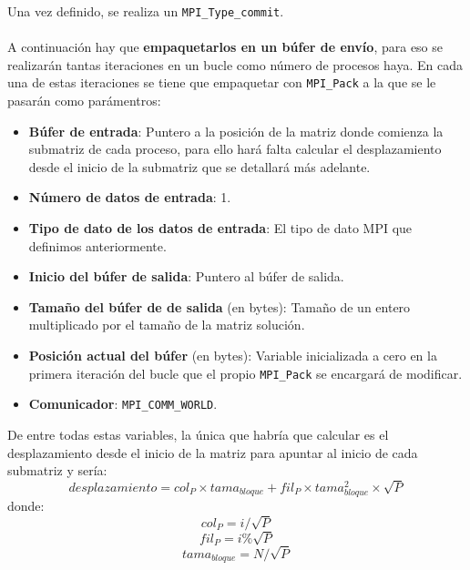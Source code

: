Una vez definido, se realiza un \texttt{MPI\_Type\_commit}.
\\ \\
A continuación hay que \textbf{empaquetarlos en un búfer de envío}, para eso se realizarán tantas iteraciones en un bucle como número de procesos haya. En cada una de estas iteraciones se tiene que empaquetar con \texttt{MPI\_Pack} a la que se le pasarán como parámentros:
\begin{itemize}
	\item \textbf{Búfer de entrada}: Puntero a la posición de la matriz donde comienza la submatriz de cada proceso, para ello hará falta calcular el desplazamiento desde el inicio de la submatriz que se detallará más adelante.
	\item \textbf{Número de datos de entrada}: 1.
	\item \textbf{Tipo de dato de los datos de entrada}: El tipo de dato MPI que definimos anteriormente.
	\item \textbf{Inicio del búfer de salida}: Puntero al búfer de salida.
	\item \textbf{Tamaño del búfer de de salida} (en bytes): Tamaño de un entero multiplicado por el tamaño de la matriz solución.
	\item \textbf{Posición actual del búfer} (en bytes): Variable inicializada a cero en la primera iteración del bucle que el propio \texttt{MPI\_Pack} se encargará de modificar.
	\item \textbf{Comunicador}: \texttt{MPI\_COMM\_WORLD}.
\end{itemize}

De entre todas estas variables, la única que habría que calcular es el desplazamiento desde el inicio de la matriz para apuntar al inicio de cada submatriz y sería:
\[ desplazamiento = col_P \times tama_{bloque} + fil_P \times tama_{bloque}^{2} \times \sqrt{P} \]
donde:
\[ col_P = i / \sqrt{P} \]
\[ fil_P = i \% \sqrt{P} \]
\[ tama_{bloque} = N / \sqrt{P} \]

